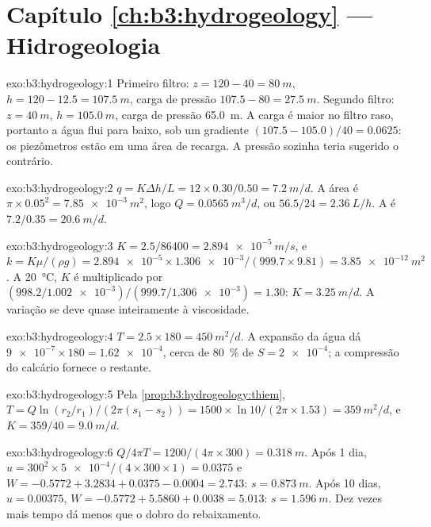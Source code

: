 \section*{Capítulo \ref{ch:b3:hydrogeology} --- Hidrogeologia}

\begin{solution}{exo:b3:hydrogeology:1}
Primeiro filtro: $z = 120 - 40 = \qty{80}{m}$, $h = 120 - 12.5 =
\qty{107.5}{m}$, carga de pressão $107.5 - 80 = \qty{27.5}{m}$. Segundo
filtro: $z = \qty{40}{m}$, $h = \qty{105.0}{m}$, carga de pressão
\qty{65.0}{m}. A carga é maior no filtro raso, portanto a água
flui para baixo, sob um gradiente $(107.5 - 105.0)/40 = \num{0.0625}$:
os piezômetros estão em uma área de recarga. A pressão sozinha teria
sugerido o contrário.
\end{solution}

\begin{solution}{exo:b3:hydrogeology:2}
$q = K\Delta h/L = 12\times0.30/0.50 = \qty{7.2}{m/d}$. A área é
$\pi\times0.05^2 = \qty{7.85e-3}{m^2}$, logo $Q = \qty{0.0565}{m^3/d}$, ou
$56.5/24 = \qty{2.36}{L/h}$. A  é $7.2/0.35 =
\qty{20.6}{m/d}$.
\end{solution}

\begin{solution}{exo:b3:hydrogeology:3}
$K = 2.5/86400 = \qty{2.894e-5}{m/s}$, e $k = K\mu/(\rho g) =
\num{2.894e-5}\times\num{1.306e-3}/(999.7\times9.81) =
\qty{3.85e-12}{m^2}$. A \qty{20}{\celsius}, $K$ é multiplicado por
$(998.2/\num{1.002e-3})/(999.7/\num{1.306e-3}) = \num{1.30}$: $K =
\qty{3.25}{m/d}$. A variação se deve quase inteiramente à viscosidade.
\end{solution}

\begin{solution}{exo:b3:hydrogeology:4}
$T = 2.5\times180 = \qty{450}{m^2/d}$. A expansão da água dá
$\num{9e-7}\times180 = \num{1.62e-4}$, cerca de \qty{80}{\percent} de $S =
\num{2e-4}$; a compressão do calcário fornece o restante.
\end{solution}

\begin{solution}{exo:b3:hydrogeology:5}
Pela \cref{prop:b3:hydrogeology:thiem}, $T = Q\ln(r_2/r_1)/(2\pi(s_1 -
s_2)) = 1500\times\ln10/(2\pi\times1.53) = \qty{359}{m^2/d}$, e $K =
359/40 = \qty{9.0}{m/d}$.
\end{solution}

\begin{solution}{exo:b3:hydrogeology:6}
$Q/4\pi T = 1200/(4\pi\times300) = \qty{0.318}{m}$. Após 1 dia, $u =
300^2\times\num{5e-4}/(4\times300\times1) = \num{0.0375}$ e $W = -0.5772
+ 3.2834 + 0.0375 - 0.0004 = \num{2.743}$: $s = \qty{0.873}{m}$. Após 10
dias, $u = \num{0.00375}$, $W = -0.5772 + 5.5860 + 0.0038 = \num{5.013}$:
$s = \qty{1.596}{m}$. Dez vezes mais tempo dá menos que o dobro do
rebaixamento.
\end{solution}

